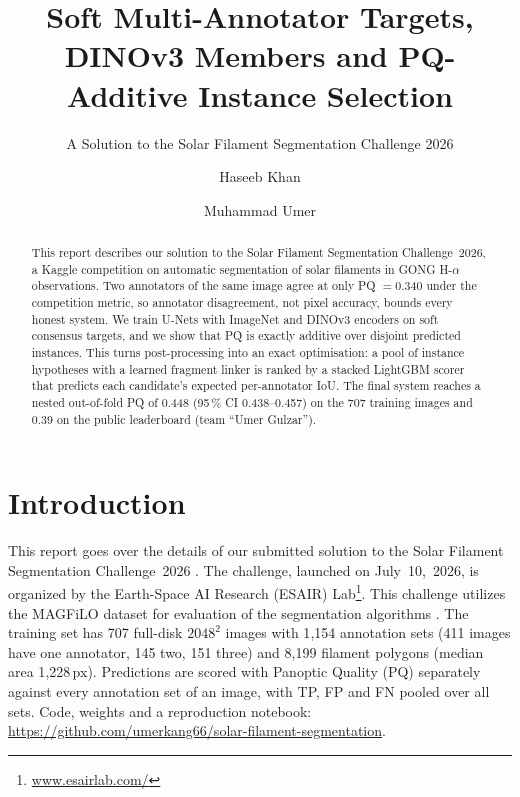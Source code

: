 \documentclass[sigconf]{acmart}
\begin{document}
\title{Soft Multi-Annotator Targets, DINOv3 Members and PQ-Additive Instance Selection}  %
\subtitle{A Solution to the Solar Filament Segmentation Challenge 2026} %


\author{Haseeb Khan}

\author{Muhammad Umer}

\begin{abstract}
    This report describes our solution to the Solar Filament Segmentation Challenge~2026, a Kaggle competition on automatic segmentation of solar filaments in GONG H-$\alpha$ observations. Two annotators of the same image agree at only PQ $=0.340$ under the competition metric, so annotator disagreement, not pixel accuracy, bounds every honest system. We train U-Nets with ImageNet and DINOv3 encoders on soft consensus targets, and we show that PQ is exactly additive over disjoint predicted instances. This turns post-processing into an exact optimisation: a pool of instance hypotheses with a learned fragment linker is ranked by a stacked LightGBM scorer that predicts each candidate's expected per-annotator IoU. The final system reaches a nested out-of-fold PQ of 0.448 (95\,\% CI 0.438--0.457) on the 707 training images and 0.39 on the public leaderboard (team ``Umer Gulzar'').
\end{abstract}

\maketitle


\section{Introduction}
    This report goes over the details of our submitted solution to the Solar Filament Segmentation Challenge~2026 \cite{filament-segmentation-2026}. The challenge, launched on July~10,~2026, is organized by the Earth-Space AI Research (ESAIR) Lab\footnote{\href{https://www.esairlab.com/home}{www.esairlab.com/}}. This challenge utilizes the MAGFiLO dataset for evaluation of the segmentation algorithms \cite{ahmadzadeh2024dataset}. The training set has 707 full-disk $2048^2$ images with 1{,}154 annotation sets (411 images have one annotator, 145 two, 151 three) and 8{,}199 filament polygons (median area 1{,}228\,px). Predictions are scored with Panoptic Quality (PQ) \cite{kirillov2019panoptic} separately against every annotation set of an image, with TP, FP and FN pooled over all sets. Code, weights and a reproduction notebook: \url{https://github.com/umerkang66/solar-filament-segmentation}.
\end{document}
